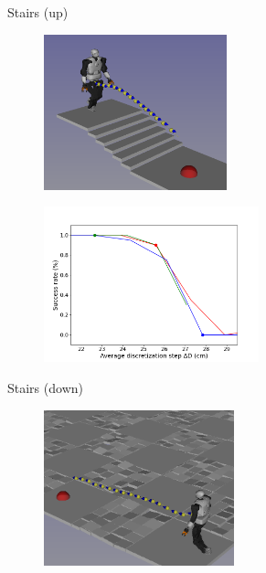 \begin{figure}[h!]
\begin{subfigure}{0.9\linewidth}
        \caption{Stairs (up)}
        \label{fig:mip:minimizing_basic:0}
    \end{subfigure}
    \begin{subfigure}{0.9\linewidth}
        \centering
        \begin{subfigure}{0.48\linewidth}
            \includegraphics[trim={1cm 0cm 0cm 0cm},clip,width=\textwidth,height=4.5cm]{Figures/Chapter_MIP_SL1M/res_mip/stairs_down.png}
        \end{subfigure}
        \begin{subfigure}{0.48\linewidth}
            \includegraphics[trim={0cm 0cm 2cm 1.8cm}, clip,width=\textwidth,height=4.5cm]{Figures/Chapter_MIP_SL1M/res_mip/MIP_stairs/FIGURE_MIP_STAIRS_DOWN.png}
        \end{subfigure}
        \caption{Stairs (down)}
        \label{fig:mip:minimizing_basic:1}
    \end{subfigure}
    \begin{subfigure}{0.9\linewidth}
        \centering
        \begin{subfigure}{0.48\linewidth}
            \includegraphics[trim={0cm 0cm 0cm 0cm},clip,width=\textwidth,height=4.5cm]{Figures/Chapter_MIP_SL1M/res_mip/scenario_rubbles.png}

\end{subfigure}
\end{subfigure}
\end{figure}
